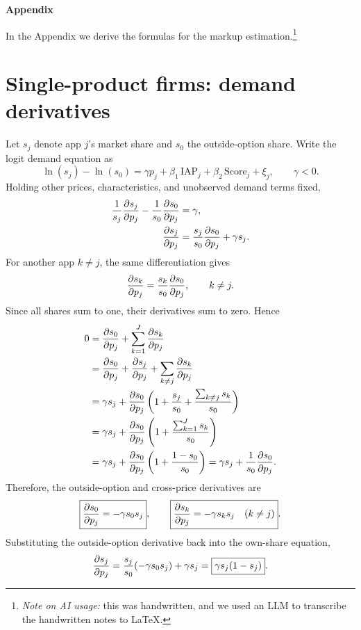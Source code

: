 \documentclass{article}
\begin{document}
\thispagestyle{plain}
{\LARGE\bfseries\color{ink}Appendix}\par
In the Appendix we derive the formulas for the markup estimation.\footnote{\textit{Note on AI usage:} this was handwritten, and we used an LLM to transcribe the handwritten notes to \LaTeX.}
\section{Single-product firms: demand derivatives}
Let $s_j$ denote app $j$'s market share and $s_0$ the outside-option share.
Write the logit demand equation as
\begin{equation}
\ln(s_j)-\ln(s_0)=\gamma p_j+\beta_1\, \text{IAP}_j+\beta_2\, \text{Score}_j+\xi_j,
\qquad \gamma<0.
\end{equation}
Holding other prices, characteristics, and unobserved demand terms fixed,
\begin{align}
\frac{1}{s_j}\frac{\partial s_j}{\partial p_j}-\frac{1}{s_0}\frac{\partial s_0}{\partial p_j}&=\gamma,\\
\frac{\partial s_j}{\partial p_j}&=\frac{s_j}{s_0}\frac{\partial s_0}{\partial p_j}+\gamma s_j.
\end{align}
For another app $k\ne j$, the same differentiation gives
\begin{equation}
\frac{\partial s_k}{\partial p_j}=\frac{s_k}{s_0}\frac{\partial s_0}{\partial p_j},\qquad k\ne j.
\end{equation}
Since all shares sum to one, their derivatives sum to zero. Hence
\begin{align*}
0
&=\frac{\partial s_0}{\partial p_j}+\sum_{k=1}^{J}\frac{\partial s_k}{\partial p_j}\\
&=\frac{\partial s_0}{\partial p_j}+\frac{\partial s_j}{\partial p_j}+\sum_{k\ne j}\frac{\partial s_k}{\partial p_j}\\
&=\gamma s_j+\frac{\partial s_0}{\partial p_j}
 \left(1+\frac{s_j}{s_0}+\frac{\sum_{k\ne j}s_k}{s_0}\right)\\
&=\gamma s_j+\frac{\partial s_0}{\partial p_j}
 \left(1+\frac{\sum_{k=1}^{J}s_k}{s_0}\right)\\
&=\gamma s_j+\frac{\partial s_0}{\partial p_j}
 \left(1+\frac{1-s_0}{s_0}\right)
 =\gamma s_j+\frac{1}{s_0}\frac{\partial s_0}{\partial p_j}.
\end{align*}
Therefore, the outside-option and cross-price derivatives are
\begin{equation}
\boxed{\frac{\partial s_0}{\partial p_j}=-\gamma s_0s_j},
\qquad
\boxed{\frac{\partial s_k}{\partial p_j}=-\gamma s_ks_j\quad(k\ne j)}.
\end{equation}
Substituting the outside-option derivative back into the own-share equation,
\begin{equation}
\frac{\partial s_j}{\partial p_j}
=\frac{s_j}{s_0}(-\gamma s_0s_j)+\gamma s_j
=\boxed{\gamma s_j(1-s_j)}.
\end{equation}
\end{document}
